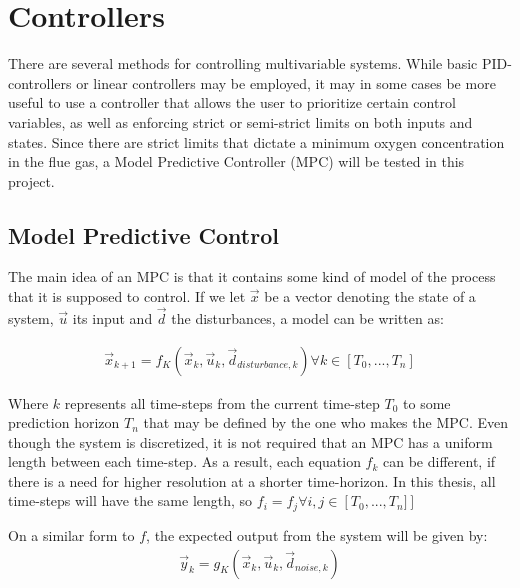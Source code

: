 \chapter{Controllers}
\label{cha:controllers}
There are several methods for controlling multivariable systems. While basic PID-controllers or linear controllers may be employed, it may in some cases be more useful to use a controller that allows the user to prioritize certain control variables, as well as enforcing strict or semi-strict limits on both inputs and states. Since there are strict limits that dictate a minimum oxygen concentration in the flue gas, a Model Predictive Controller (MPC) will be tested in this project.



\section{Model Predictive Control}
\label{sec:MPC}

The main idea of an MPC is that it contains some kind of model of the process that it is supposed to control. If we let $\vec{x}$ be a vector denoting the state of a system, $\vec{u}$ its input and $\vec{d}$ the disturbances, a model can be written as:

\begin{align}
  \vec{x}_{k+1}   = f_K\left( \vec{x}_{k} , \vec{u}_k , \vec{d}_{disturbance,k} \right)
  \forall k \in \left[ T_0, ..., T_n \right]
\end{align}

\noindent
Where $k$ represents all time-steps from the current time-step $T_0$ to some prediction horizon $T_n$ that may be defined by the one who makes the MPC. Even though the system is discretized, it is not required that an MPC has a uniform length between each time-step. As a result, each equation $f_k$ can be different, if there is a need for higher resolution at a shorter time-horizon. In this thesis, all time-steps will have the same length, so $f_i = f_j \forall i,j \in \left[ T_0,...,T_n] \right]$

On a similar form to $f$, the expected output from the system will be given by:
\begin{align}
  \vec{y}_k = g_K\left( \vec{x}_k, \vec{u}_k , \vec{d}_{noise, k} \right)
\end{align}


